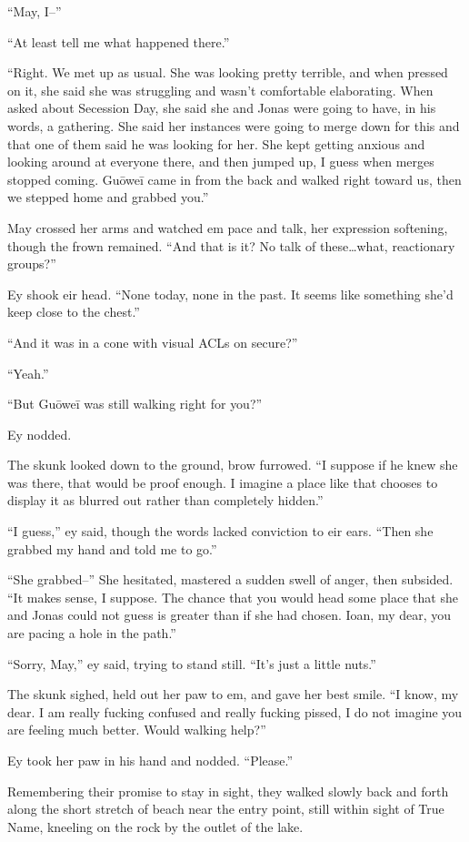 ``May, I--''

``At least tell me what happened there.''

``Right. We met up as usual. She was looking pretty terrible, and when pressed on it, she said she was struggling and wasn't comfortable elaborating. When asked about Secession Day, she said she and Jonas were going to have, in his words, a gathering. She said her instances were going to merge down for this and that one of them said he was looking for her. She kept getting anxious and looking around at everyone there, and then jumped up, I guess when merges stopped coming. Guōweī came in from the back and walked right toward us, then we stepped home and grabbed you.''

May crossed her arms and watched em pace and talk, her expression softening, though the frown remained. ``And that is it? No talk of these\ldots what, reactionary groups?''

Ey shook eir head. ``None today, none in the past. It seems like something she'd keep close to the chest.''

``And it was in a cone with visual ACLs on secure?''

``Yeah.''

``But Guōweī was still walking right for you?''

Ey nodded.

The skunk looked down to the ground, brow furrowed. ``I suppose if he knew she was there, that would be proof enough. I imagine a place like that chooses to display it as blurred out rather than completely hidden.''

``I guess,'' ey said, though the words lacked conviction to eir ears. ``Then she grabbed my hand and told me to go.''

``She grabbed--'' She hesitated, mastered a sudden swell of anger, then subsided. ``It makes sense, I suppose. The chance that you would head some place that she and Jonas could not guess is greater than if she had chosen. Ioan, my dear, you are pacing a hole in the path.''

``Sorry, May,'' ey said, trying to stand still. ``It's just a little nuts.''

The skunk sighed, held out her paw to em, and gave her best smile. ``I know, my dear. I am really fucking confused and really fucking pissed, I do not imagine you are feeling much better. Would walking help?''

Ey took her paw in his hand and nodded. ``Please.''

Remembering their promise to stay in sight, they walked slowly back and forth along the short stretch of beach near the entry point, still within sight of True Name, kneeling on the rock by the outlet of the lake.

